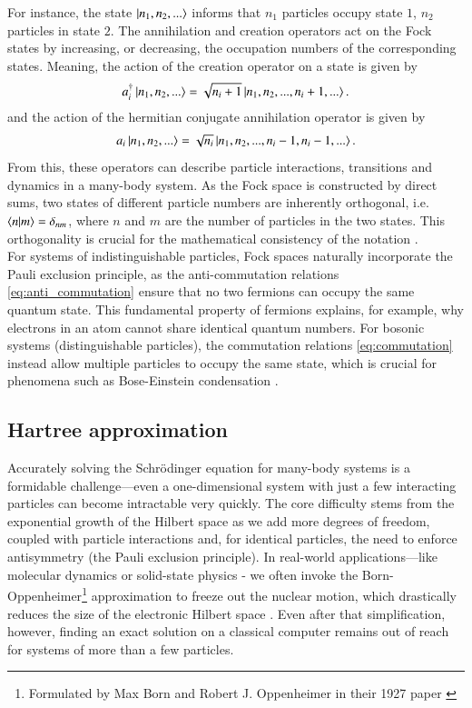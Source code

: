\documentclass{subfiles}
\begin{document}
For instance, the state $\ket{n_1, n_2, ...}$ informs that $n_1$ particles occupy state $1$, $n_2$ particles  in state $2$. The annihilation and creation operators act on the Fock states by increasing, or decreasing, the occupation numbers of the corresponding states. Meaning, the action of the creation operator on a state is given by
\begin{align*}
    a^\dagger_i\ket{n_1, n_2, ...} = \sqrt{n_i + 1}\ket{n_1, n_2, ..., n_i + 1, ...}.
\end{align*}
and the action of the hermitian conjugate annihilation operator is given by
\begin{align*}
    a_i\ket{n_1, n_2, ...} = \sqrt{n_i}\ket{n_1, n_2, ...,n_i-1, n_i - 1, ...}.
\end{align*}
From this, these operators can describe particle interactions, transitions and dynamics in a many-body system. As the Fock space is constructed by direct sums, two states of different particle numbers are inherently orthogonal, i.e. $\braket{n|m} = \delta_{nm}$, where $n$ and $m$ are the number of particles in the two states. This orthogonality is crucial for the mathematical consistency of the notation \cite{helgaker2013molecular, shavitt2009many}.
\\

For systems of indistinguishable particles, Fock spaces naturally incorporate the Pauli exclusion principle, as the anti-commutation relations \eqref{eq:anti_commutation} ensure that no two fermions can occupy the same quantum state. This fundamental property of fermions explains, for example, why electrons in an atom cannot share identical quantum numbers. For bosonic systems (distinguishable particles), the commutation relations \eqref{eq:commutation} instead allow multiple particles to occupy the same state, which is crucial for phenomena such as Bose-Einstein condensation \cite{pethick2008bose}.


\subsection{Hartree approximation}\label{sec:hartree_theory}
Accurately solving the Schrödinger equation for many-body systems is a formidable challenge—even a one-dimensional system with just a few interacting particles can become intractable very quickly. The core difficulty stems from the exponential growth of the Hilbert space as we add more degrees of freedom, coupled with particle interactions and, for identical particles, the need to enforce antisymmetry (the Pauli exclusion principle). In real-world applications—like molecular dynamics or solid-state physics - we often invoke the Born-Oppenheimer\footnote{Formulated by Max Born and Robert J. Oppenheimer in their 1927 paper \cite{Born_Oppenheimer_1927}} approximation to freeze out the nuclear motion, which drastically reduces the size of the electronic Hilbert space \cite{helgaker2013molecular, szabo1996modern}. Even after that simplification, however, finding an exact solution on a classical computer remains out of reach for systems of more than a few particles.
\\ 
\end{document}
